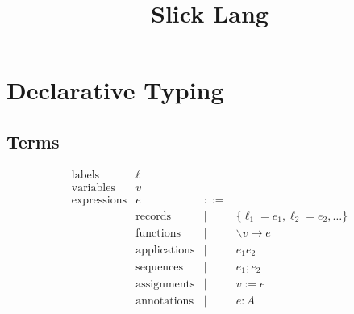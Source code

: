 \documentclass{article}
\title{Slick Lang}
\date{}
\author{}
\newcommand{\bnfvar}[1]{\langle \texttt{#1} \rangle}
\newcommand{\define}{::=}
\newcommand{\arrow}{\to}
\newcommand{\rcd}[1]{\{#1\}}
\newcommand{\lbl}{\ell}
\newcommand{\expr}{e}
\newcommand{\var}{v}
\newcommand{\tp}{A}
\begin{document}
\maketitle

% 
% 
% 

\section{Declarative Typing}

\subsection{Terms}

\[
  \begin{array}{llll}
    \text{labels} & \lbl & & \\
    \text{variables} & \var & & \\
    \text{expressions} & \expr & \define & \\
    & \text{records} & | & \rcd{\lbl_1=\expr_1, \lbl_2=\expr_2,\dots} \\
    & \text{functions} & | & \backslash \var
                           \arrow \expr \\
    & \text{applications} & | & \expr_1 \expr_2 \\
    & \text{sequences} & | & \expr_1 ; \expr_2 \\
    & \text{assignments} & | & \var := \expr \\
    & \text{annotations} & | & \expr : \tp
  \end{array}
\]
\end{document}
